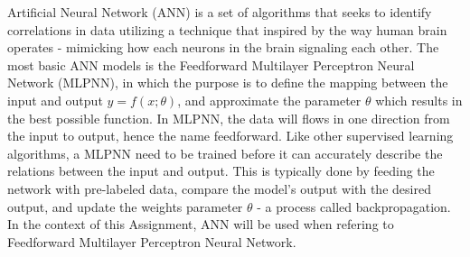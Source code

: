 \documentclass[../BachelorAssignment.tex]{subfiles}
\begin{document}
\graphicspath{{\subfix{../Images/}}}

Artificial Neural Network (ANN) is a set of algorithms that seeks to identify correlations in data utilizing a technique that inspired by the way human brain operates - mimicking how each neurons in the brain signaling each other. The most basic ANN models is the Feedforward Multilayer Perceptron Neural Network (MLPNN), in which the purpose is to define the mapping between the input and output \(y = f(x;\theta)\), and approximate the parameter \(\theta\) which results in the best possible function. In MLPNN, the data will flows in one direction from the input to output, hence the name feedforward. Like other supervised learning algorithms, a MLPNN need to be trained before it can accurately describe the relations between the input and output. This is typically done by feeding the network with pre-labeled data, compare the model's output with the desired output, and update the weights parameter \(\theta\) - a process called backpropagation. In the context of this Assignment, ANN will be used when refering to Feedforward Multilayer Perceptron Neural Network. 
\end{document}
